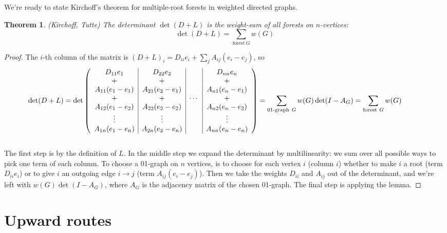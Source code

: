 \documentclass[a4paper, 11pt]{article}
\newtheorem{theorem}{Theorem}[section]
\theoremstyle{definition}
\begin{document}
\medskip
We're ready to state Kirchoff's theorem for multiple-root forests in weighted directed graphs.

\begin{theorem} (Kirchoff, Tutte) The determinant $\det(D + L)$ is the weight-sum of all forests on $n$-vertices:
  \[
    \det(D + L) = \sum_{\text{forest}\ G} w(G)
  \]
\end{theorem}
\begin{proof}
  The $i$-th column of the matrix is $(D + L)_i = D_{ii} e_i + \sum_j A_{ij}(e_i - e_j)$, so \\
  \begin{align*}
    \hspace*{-1cm}
    \det(D + L) = \det \left(
    \begin{array}{c|c|c|c}
      D_{11} e_1         & D_{22} e_2         &        & D_{nn} e_n          \\
      +                  & +                  &        & +                   \\
      A_{11} (e_1 - e_1) & A_{21} (e_2 - e_1) &        & A_{n1} (e_n - e_1)  \\
      +                  & +                  & \cdots & +                   \\
      A_{12} (e_1 - e_2) & A_{22} (e_2 - e_2) &        & A_{n2} (e_n - e_2)  \\
      \vdots             & \vdots             &        & \vdots              \\
      A_{1n} (e_1 - e_n) & A_{2n} (e_2 - e_n) &        & A_{nn} (e_n - e_n)
    \end{array} \right)
    = \sum_{\text{01-graph}\ G} w(G) \det(I - A_G)
    = \sum_{\text{forest}\ G} w(G)
  \end{align*} \\
  The first step is by the definition of $L$. In the middle step we expand the determinant by multilinearity: we sum over all possible ways to pick one term of each column. To choose a 01-graph on $n$ vertices, is to choose for each vertex $i$ (column $i$) whether to make $i$ a root (term $D_{ii} e_i$) or to give $i$ an outgoing edge $i \to j$ (term $A_{ij}(e_i - e_j)$). Then we take the weights $D_{ii}$ and $A_{ij}$ out of the determinant, and we're left with $w(G)\det(I - A_G)$, where $A_G$ is the adjacency matrix of the chosen 01-graph. The final step is applying the lemma.
\end{proof}

\section{Upward routes}
\end{document}
